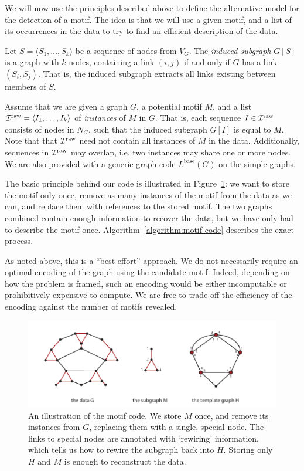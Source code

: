 \documentclass[twoside,11pt]{article}
\begin{document}
\label{section:motif-code}

We will now use the principles described above to define the alternative model for the detection of a motif. The idea is that we will use a given motif, and a list of its occurrences in the data to try to find an efficient description of the data. 

Let $S = \langle S_1, \ldots, S_k \rangle$ be a sequence of nodes from $V_G$. The \emph{induced subgraph} $G[S]$ is a graph  with $k$ nodes, containing a link  $(i, j)$ if and only if $G$ has a link $(S_i, S_j)$. That is, the induced subgraph extracts all links existing between members of $S$. 

Assume that we are given a graph $G$, a potential motif $M$, and a list ${\cal I}^\text{raw} = \langle I_1, \ldots, I_k\rangle$ of \emph{instances} of $M$ in $G$. That is, each sequence $I\in {\cal I}^\text{raw}$ consists  of nodes in $N_G$, such that the induced subgraph $G[I]$ is equal to $M$. Note that that ${\cal I}^\text{raw}$ need not contain all instances of $M$ in the data. Additionally, sequences in ${\cal I}^\text{raw}$ may overlap, i.e. two instances may share one or more nodes. We are also provided with a generic graph code $L^\text{base}(G)$ on the simple graphs. 

The basic principle behind our code is illustrated in Figure~\ref{figure:motif-code}: we want to store the motif only once, remove as many instances of the motif from the data as we can, and replace them with references to the stored motif. The two graphs combined contain enough information to recover the data, but we have only had to describe the motif once. Algorithm~\ref{algorithm:motif-code} describes the exact process. 

As noted above, this is a ``best effort'' approach. We do not necessarily require an optimal encoding of the graph using the candidate motif. Indeed, depending on how the problem is framed, such an encoding would be either incomputable or prohibitively expensive to compute. We are free to trade off the efficiency of the encoding against the number of motifs revealed.  

\begin{figure}[htb]
  \includegraphics[width=\textwidth]{./images/illustration.pdf}
  \caption{An illustration of the motif code. We store $M$ once, and remove its instances from $G$, replacing them with a single, special node. The links to special nodes are annotated with `rewiring' information, which tells us how to rewire the subgraph back into $H$. Storing only $H$ and $M$ is enough to reconstruct the data.}
   \label{figure:motif-code}
\end{figure}  
\end{document}
